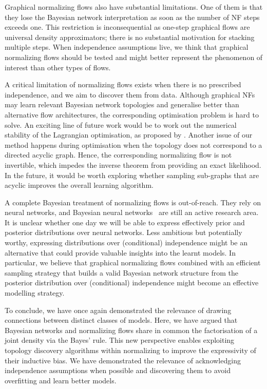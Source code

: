 Graphical normalizing flows also have substantial limitations. One of them is that they lose the Bayesian network interpretation as soon as the number of NF steps exceeds one. This restriction is inconsequential as one-step graphical flows are universal density approximators; there is no substantial motivation for stacking multiple steps. When independence assumptions live, we think that graphical normalizing flows should be tested and might better represent the phenomenon of interest than other types of flows.

A critical limitation of normalizing flows exists when there is no prescribed independence, and we aim to discover them from data. Although graphical NFs may learn relevant Bayesian network topologies and generalise better than alternative flow architectures, the corresponding optimisation problem is hard to solve. An exciting line of future work would be to work out the numerical stability of the Lagrangian optimisation, as proposed by \citet{ng2022convergence}. Another issue of our method happens during optimisation when the topology does not correspond to a directed acyclic graph. Hence, the corresponding normalizing flow is not invertible, which impedes the inverse theorem from providing an exact likelihood. In the future, it would be worth exploring whether sampling sub-graphs that are acyclic improves the overall learning algorithm.

A complete Bayesian treatment of normalizing flows is out-of-reach. They rely on neural networks, and Bayesian neural networks~\citep{mackay1995bayesian} are still an active research area. It is unclear whether one day we will be able to express effectively prior and posterior distributions over neural networks. Less ambitious but potentially worthy, expressing distributions over (conditional) independence might be an alternative that could provide valuable insights into the learnt models. In particular, we believe that graphical normalizing flows combined with an efficient sampling strategy that builds a valid Bayesian network structure from the posterior distribution over (conditional) independence might become an effective modelling strategy.

To conclude, we have once again demonstrated the relevance of drawing connections between distinct classes of models. Here, we have argued that Bayesian networks and normalizing flows share in common the factorisation of a joint density via the Bayes' rule. This new perspective enables exploiting topology discovery algorithms within normalizing to improve the expressivity of their inductive bias. We have demonstrated the relevance of acknowledging independence assumptions when possible and discovering them to avoid overfitting and learn better models. 

